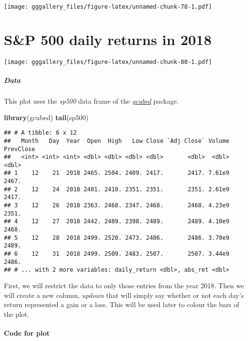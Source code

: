 \documentclass[]{book}
\newenvironment{Shaded}{\begin{snugshade}}{\end{snugshade}}
\newcommand{\KeywordTok}[1]{\textcolor[rgb]{0.13,0.29,0.53}{\textbf{#1}}}
\newcommand{\NormalTok}[1]{#1}
\let\oldparagraph\paragraph
\renewcommand{\paragraph}[1]{\oldparagraph{#1}\mbox{}}
\begin{document}
\texttt{[image: gggallery\_files/figure-latex/unnamed-chunk-78-1.pdf]}

\hypertarget{sp}{%
\chapter*{S\&P 500 daily returns in 2018}\label{sp}}

\texttt{[image: gggallery\_files/figure-latex/unnamed-chunk-80-1.pdf]}

\hypertarget{spdata}{%
\paragraph{Data}\label{spdata}}

This plot uses the \emph{sp500} data frame of the \protect\hyperlink{gcubed}{\emph{gcubed}} package.

\begin{Shaded}
\begin{Highlighting}[]
\KeywordTok{library}\NormalTok{(gcubed)}
\KeywordTok{tail}\NormalTok{(sp500)}
\end{Highlighting}
\end{Shaded}

\begin{verbatim}
## # A tibble: 6 x 12
##   Month   Day  Year  Open  High   Low Close `Adj Close` Volume PrevClose
##   <int> <int> <int> <dbl> <dbl> <dbl> <dbl>       <dbl>  <dbl>     <dbl>
## 1    12    21  2018 2465. 2504. 2409. 2417.       2417. 7.61e9     2467.
## 2    12    24  2018 2401. 2410. 2351. 2351.       2351. 2.61e9     2417.
## 3    12    26  2018 2363. 2468. 2347. 2468.       2468. 4.23e9     2351.
## 4    12    27  2018 2442. 2489. 2398. 2489.       2489. 4.10e9     2468.
## 5    12    28  2018 2499. 2520. 2473. 2486.       2486. 3.70e9     2489.
## 6    12    31  2018 2499. 2509. 2483. 2507.       2507. 3.44e9     2486.
## # ... with 2 more variables: daily_return <dbl>, abs_ret <dbl>
\end{verbatim}

First, we will restrict the data to only those entries from the year 2018. Then we will create a new column, \emph{updown} that will simply say whether or not each day's return represented a gain or a loss. This will be used later to colour the bars of the plot.

\hypertarget{spcode}{%
\subsubsection*{Code for plot}\label{spcode}}
\end{document}
